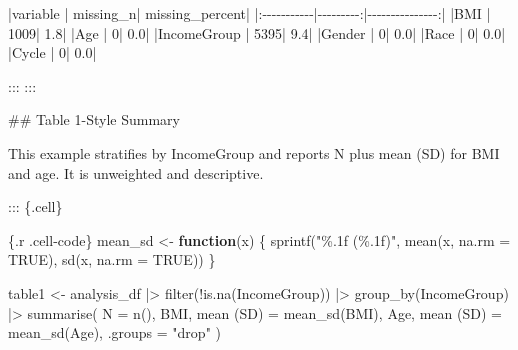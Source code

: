 \documentclass[
  letterpaper,
  DIV=11,
  numbers=noendperiod,
  oneside]{scrreprt}
\newenvironment{Shaded}{\begin{snugshade}}{\end{snugshade}}
\newcommand{\AttributeTok}[1]{\textcolor[rgb]{0.40,0.45,0.13}{#1}}
\newcommand{\ConstantTok}[1]{\textcolor[rgb]{0.56,0.35,0.01}{#1}}
\newcommand{\ControlFlowTok}[1]{\textcolor[rgb]{0.00,0.23,0.31}{\textbf{#1}}}
\newcommand{\FunctionTok}[1]{\textcolor[rgb]{0.28,0.35,0.67}{#1}}
\newcommand{\InformationTok}[1]{\textcolor[rgb]{0.37,0.37,0.37}{#1}}
\newcommand{\NormalTok}[1]{\textcolor[rgb]{0.00,0.23,0.31}{#1}}
\newcommand{\OtherTok}[1]{\textcolor[rgb]{0.00,0.23,0.31}{#1}}
\newcommand{\PreprocessorTok}[1]{\textcolor[rgb]{0.68,0.00,0.00}{#1}}
\newcommand{\SpecialCharTok}[1]{\textcolor[rgb]{0.37,0.37,0.37}{#1}}
\newcommand{\StringTok}[1]{\textcolor[rgb]{0.13,0.47,0.30}{#1}}
\begin{document}
\begin{Shaded}
\begin{Highlighting}[numbers=left,,]
\PreprocessorTok{|}\NormalTok{variable    }\PreprocessorTok{|}\NormalTok{ missing\_n}\PreprocessorTok{|}\NormalTok{ missing\_percent}\PreprocessorTok{|}
\PreprocessorTok{|:{-}{-}{-}{-}{-}{-}{-}{-}{-}{-}{-}|{-}{-}{-}{-}{-}{-}{-}{-}{-}:|{-}{-}{-}{-}{-}{-}{-}{-}{-}{-}{-}{-}{-}{-}{-}:|}
\PreprocessorTok{|}\NormalTok{BMI         }\PreprocessorTok{|}\NormalTok{      1009}\PreprocessorTok{|}\NormalTok{             1.8}\PreprocessorTok{|}
\PreprocessorTok{|}\NormalTok{Age         }\PreprocessorTok{|}\NormalTok{         0}\PreprocessorTok{|}\NormalTok{             0.0}\PreprocessorTok{|}
\PreprocessorTok{|}\NormalTok{IncomeGroup }\PreprocessorTok{|}\NormalTok{      5395}\PreprocessorTok{|}\NormalTok{             9.4}\PreprocessorTok{|}
\PreprocessorTok{|}\NormalTok{Gender      }\PreprocessorTok{|}\NormalTok{         0}\PreprocessorTok{|}\NormalTok{             0.0}\PreprocessorTok{|}
\PreprocessorTok{|}\NormalTok{Race        }\PreprocessorTok{|}\NormalTok{         0}\PreprocessorTok{|}\NormalTok{             0.0}\PreprocessorTok{|}
\PreprocessorTok{|}\NormalTok{Cycle       }\PreprocessorTok{|}\NormalTok{         0}\PreprocessorTok{|}\NormalTok{             0.0}\PreprocessorTok{|}


\NormalTok{:::}
\NormalTok{:::}


\FunctionTok{\#\# Table 1{-}Style Summary}

\NormalTok{This example stratifies by }\InformationTok{\textasciigrave{}IncomeGroup\textasciigrave{}}\NormalTok{ and reports N plus mean (SD) for BMI and age. It is unweighted and descriptive.}


\NormalTok{::: \{.cell\}}

\InformationTok{\textasciigrave{}\textasciigrave{}\textasciigrave{}\{.r .cell{-}code\}}
\NormalTok{mean\_sd }\OtherTok{\textless{}{-}} \ControlFlowTok{function}\NormalTok{(x) \{}
  \FunctionTok{sprintf}\NormalTok{(}\StringTok{"\%.1f (\%.1f)"}\NormalTok{, }\FunctionTok{mean}\NormalTok{(x, }\AttributeTok{na.rm =} \ConstantTok{TRUE}\NormalTok{), }\FunctionTok{sd}\NormalTok{(x, }\AttributeTok{na.rm =} \ConstantTok{TRUE}\NormalTok{))}
\NormalTok{\}}

\NormalTok{table1 }\OtherTok{\textless{}{-}}\NormalTok{ analysis\_df }\SpecialCharTok{|\textgreater{}}
  \FunctionTok{filter}\NormalTok{(}\SpecialCharTok{!}\FunctionTok{is.na}\NormalTok{(IncomeGroup)) }\SpecialCharTok{|\textgreater{}}
  \FunctionTok{group\_by}\NormalTok{(IncomeGroup) }\SpecialCharTok{|\textgreater{}}
  \FunctionTok{summarise}\NormalTok{(}
    \AttributeTok{N =} \FunctionTok{n}\NormalTok{(),}
    \StringTok{\textasciigrave{}}\AttributeTok{BMI, mean (SD)}\StringTok{\textasciigrave{}} \OtherTok{=} \FunctionTok{mean\_sd}\NormalTok{(BMI),}
    \StringTok{\textasciigrave{}}\AttributeTok{Age, mean (SD)}\StringTok{\textasciigrave{}} \OtherTok{=} \FunctionTok{mean\_sd}\NormalTok{(Age),}
    \AttributeTok{.groups =} \StringTok{"drop"}
\NormalTok{  )}


\end{Highlighting}
\end{Shaded}
\end{document}
